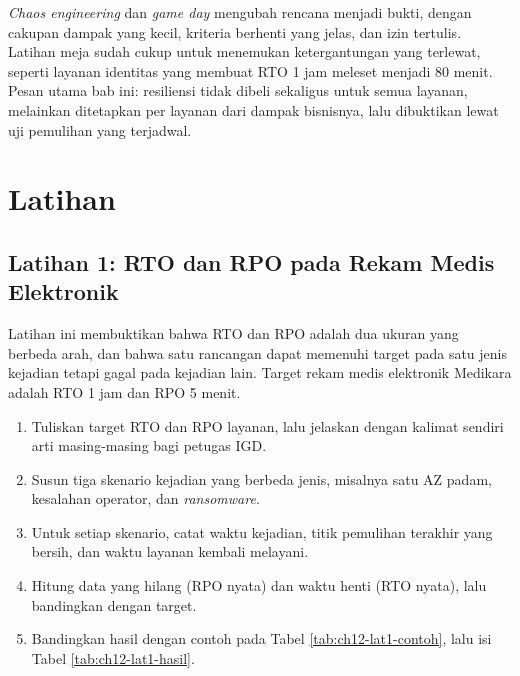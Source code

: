 \textit{Chaos engineering} dan \textit{game day} mengubah rencana menjadi bukti, dengan cakupan
dampak yang kecil, kriteria berhenti yang jelas, dan izin tertulis. Latihan meja sudah cukup untuk
menemukan ketergantungan yang terlewat, seperti layanan identitas yang membuat RTO 1 jam meleset
menjadi 80 menit. Pesan utama bab ini: resiliensi tidak dibeli sekaligus untuk semua layanan,
melainkan ditetapkan per layanan dari dampak bisnisnya, lalu dibuktikan lewat uji pemulihan yang
terjadwal.

\section{Latihan}

\subsection*{Latihan 1: RTO dan RPO pada Rekam Medis Elektronik}

Latihan ini membuktikan bahwa RTO dan RPO adalah dua ukuran yang berbeda arah, dan bahwa satu
rancangan dapat memenuhi target pada satu jenis kejadian tetapi gagal pada kejadian lain. Target
rekam medis elektronik Medikara adalah RTO 1 jam dan RPO 5 menit.

\begin{enumerate}
  \item Tuliskan target RTO dan RPO layanan, lalu jelaskan dengan kalimat sendiri arti
        masing-masing bagi petugas IGD.
  \item Susun tiga skenario kejadian yang berbeda jenis, misalnya satu AZ padam, kesalahan operator,
        dan \textit{ransomware}.
  \item Untuk setiap skenario, catat waktu kejadian, titik pemulihan terakhir yang bersih, dan waktu
        layanan kembali melayani.
  \item Hitung data yang hilang (RPO nyata) dan waktu henti (RTO nyata), lalu bandingkan dengan
        target.
  \item Bandingkan hasil dengan contoh pada Tabel \ref{tab:ch12-lat1-contoh}, lalu isi Tabel
        \ref{tab:ch12-lat1-hasil}.
\end{enumerate}

